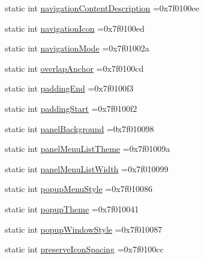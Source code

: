 \begin{DoxyCompactItemize}
\item 
static int \hyperlink{classandroid_1_1support_1_1graphics_1_1drawable_1_1R_1_1attr_a18672c039d1ab6b2ec83d54ddb8831fa}{navigation\+Content\+Description} =0x7f0100ee
\item 
static int \hyperlink{classandroid_1_1support_1_1graphics_1_1drawable_1_1R_1_1attr_a482f667b3d4e2b9b240008421b405fb2}{navigation\+Icon} =0x7f0100ed
\item 
static int \hyperlink{classandroid_1_1support_1_1graphics_1_1drawable_1_1R_1_1attr_a959d057d3a4ae0ac52199424242b8220}{navigation\+Mode} =0x7f01002a
\item 
static int \hyperlink{classandroid_1_1support_1_1graphics_1_1drawable_1_1R_1_1attr_a05fa6ec119aabfd3b7f59b773ac6469f}{overlap\+Anchor} =0x7f0100cd
\item 
static int \hyperlink{classandroid_1_1support_1_1graphics_1_1drawable_1_1R_1_1attr_a313bf7dcc9f32fa7eb7517f1bc79bb49}{padding\+End} =0x7f0100f3
\item 
static int \hyperlink{classandroid_1_1support_1_1graphics_1_1drawable_1_1R_1_1attr_a4c27ae123064fb2be391175bdb4b4879}{padding\+Start} =0x7f0100f2
\item 
static int \hyperlink{classandroid_1_1support_1_1graphics_1_1drawable_1_1R_1_1attr_a41243e726037a0464a7b80049c997917}{panel\+Background} =0x7f010098
\item 
static int \hyperlink{classandroid_1_1support_1_1graphics_1_1drawable_1_1R_1_1attr_a08dc50867a27d91d075f78f645f7d384}{panel\+Menu\+List\+Theme} =0x7f01009a
\item 
static int \hyperlink{classandroid_1_1support_1_1graphics_1_1drawable_1_1R_1_1attr_a96b96b27845c548314b6af1d31bbf307}{panel\+Menu\+List\+Width} =0x7f010099
\item 
static int \hyperlink{classandroid_1_1support_1_1graphics_1_1drawable_1_1R_1_1attr_aebd17a8bf52702bf57981f230757ed9e}{popup\+Menu\+Style} =0x7f010086
\item 
static int \hyperlink{classandroid_1_1support_1_1graphics_1_1drawable_1_1R_1_1attr_a90e617a1bc9e575ec31de0d1438fe886}{popup\+Theme} =0x7f010041
\item 
static int \hyperlink{classandroid_1_1support_1_1graphics_1_1drawable_1_1R_1_1attr_a1790c5d5f95b0324db778d72a7c6370a}{popup\+Window\+Style} =0x7f010087
\item 
static int \hyperlink{classandroid_1_1support_1_1graphics_1_1drawable_1_1R_1_1attr_a04a7405753c664f645bbb521586b88cc}{preserve\+Icon\+Spacing} =0x7f0100cc
\item 

\end{DoxyCompactItemize}
